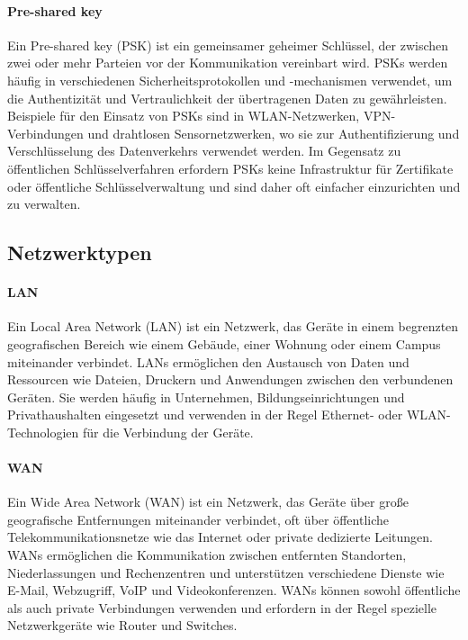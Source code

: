 \paragraph{Pre-shared key}

Ein Pre-shared key (PSK) ist ein gemeinsamer geheimer Schlüssel, der zwischen zwei oder mehr Parteien vor der Kommunikation vereinbart wird. PSKs werden häufig in verschiedenen Sicherheitsprotokollen und -mechanismen verwendet, um die Authentizität und Vertraulichkeit der übertragenen Daten zu gewährleisten. Beispiele für den Einsatz von PSKs sind in WLAN-Netzwerken, VPN-Verbindungen und drahtlosen Sensornetzwerken, wo sie zur Authentifizierung und Verschlüsselung des Datenverkehrs verwendet werden. Im Gegensatz zu öffentlichen Schlüsselverfahren erfordern PSKs keine Infrastruktur für Zertifikate oder öffentliche Schlüsselverwaltung und sind daher oft einfacher einzurichten und zu verwalten.

\subsection{Netzwerktypen}

\paragraph{LAN}

Ein Local Area Network (LAN) ist ein Netzwerk, das Geräte in einem begrenzten geografischen Bereich wie einem Gebäude, einer Wohnung oder einem Campus miteinander verbindet. LANs ermöglichen den Austausch von Daten und Ressourcen wie Dateien, Druckern und Anwendungen zwischen den verbundenen Geräten. Sie werden häufig in Unternehmen, Bildungseinrichtungen und Privathaushalten eingesetzt und verwenden in der Regel Ethernet- oder WLAN-Technologien für die Verbindung der Geräte.

\paragraph{WAN}

Ein Wide Area Network (WAN) ist ein Netzwerk, das Geräte über große geografische Entfernungen miteinander verbindet, oft über öffentliche Telekommunikationsnetze wie das Internet oder private dedizierte Leitungen. WANs ermöglichen die Kommunikation zwischen entfernten Standorten, Niederlassungen und Rechenzentren und unterstützen verschiedene Dienste wie E-Mail, Webzugriff, VoIP und Videokonferenzen. WANs können sowohl öffentliche als auch private Verbindungen verwenden und erfordern in der Regel spezielle Netzwerkgeräte wie Router und Switches.

